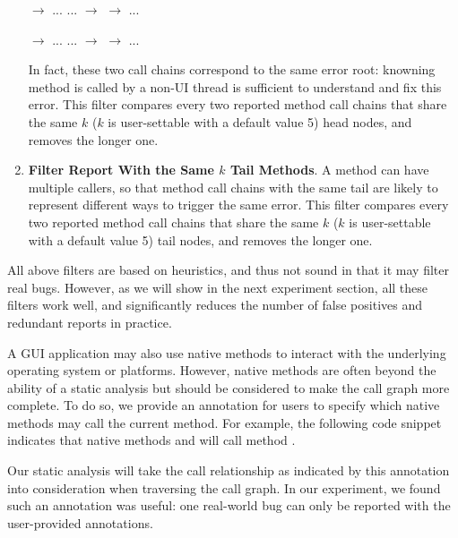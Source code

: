 \begin{enumerate}
 $\rightarrow$ ... ... $\rightarrow$  $\rightarrow$  ...

 $\rightarrow$ ... ... $\rightarrow$  $\rightarrow$  ...

In fact, these two call chains correspond to the same error root: knowning
method  is called by a non-UI thread is sufficient to understand and fix this error.
This filter compares every two reported method call chains that share the same
$k$ ($k$ is user-settable with a default value 5) head nodes, and removes the longer one.

\item \textbf{Filter Report With the Same $k$ Tail Methods}. A method
can have multiple callers, so that method call chains with the same tail are likely
to represent different ways to trigger the same error. This filter compares every
two reported method call chains that share the same 
$k$ ($k$ is user-settable with a default value 5) tail nodes, and removes the longer one.


\end{enumerate}

All above filters are based on heuristics, and thus not sound in
that it may filter real bugs. However, as we will show in
the next experiment section, all these filters work well, and significantly
reduces the number of false positives and redundant reports in practice.

A GUI application may also use native methods to interact with the underlying
operating system or platforms. However, native methods are often
beyond the ability of a static analysis but should be considered to make
the call graph more complete. To do so, we provide an annotation 
for users to specify which native methods may call the current method. For example,
the following code snippet indicates that native methods  and 
will call method .

{}

{}


Our static analysis will take the call relationship as indicated by this
annotation into consideration when traversing the call graph. In our experiment,
we found such an annotation was useful: one real-world bug can only be reported
with the user-provided annotations.

